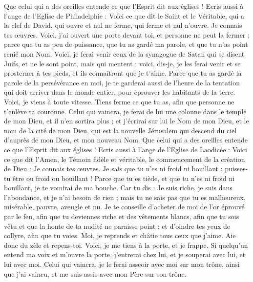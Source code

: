 \begin{multicols}{2}
Que celui qui a des oreilles entende ce que l'Esprit dit aux églises !
Ecris aussi à l'ange de l'Eglise de Philadelphie : Voici ce que dit le Saint et le Véritable, qui a la clef de David, qui ouvre et nul ne ferme, qui ferme et nul n'ouvre.
Je connais tes œuvres. Voici, j'ai ouvert une porte devant toi, et personne ne peut la fermer ; parce que tu as peu de puissance, que tu as gardé ma parole, et que tu n'as point renié mon Nom.
Voici, je ferai venir ceux de la synagogue de Satan qui se disent Juifs, et ne le sont point, mais qui mentent ; voici, dis-je, je les ferai venir et se prosterner à tes pieds, et ils connaîtront que je t'aime.
Parce que tu as gardé la parole de la persévérance en moi, je te garderai aussi de l'heure de la tentation qui doit arriver dans le monde entier, pour éprouver les habitants de la terre.
Voici, je viens à toute vitesse. Tiens ferme ce que tu as, afin que personne ne t'enlève ta couronne.
Celui qui vaincra, je ferai de lui une colonne dans le temple de mon Dieu, et il n'en sortira plus ; et j'écrirai sur lui le Nom de mon Dieu, et le nom de la cité de mon Dieu, qui est la nouvelle Jérusalem qui descend du ciel d'auprès de mon Dieu, et mon nouveau Nom.
Que celui qui a des oreilles entende ce que l'Esprit dit aux églises !
Ecris aussi à l'ange de l'Eglise de Laodicée : Voici ce que dit l'Amen, le Témoin fidèle et véritable, le commencement de la création de Dieu :
Je connais tes œuvres. Je sais que tu n'es ni froid ni bouillant ; puisses-tu être ou froid ou bouillant !
Parce que tu es tiède, et que tu n'es ni froid ni bouillant, je te vomirai de ma bouche.
Car tu dis : Je suis riche, je suis dans l'abondance, et je n'ai besoin de rien ; mais tu ne sais pas que tu es malheureux, misérable, pauvre, aveugle et nu.
Je te conseille d'acheter de moi de l'or éprouvé par le feu, afin que tu deviennes riche et des vêtements blancs, afin que tu sois vêtu et que la honte de ta nudité ne paraisse point ; et d'oindre tes yeux de collyre, afin que tu voies.
Moi, je reprends et châtie tous ceux que j'aime. Aie donc du zèle et repens-toi.
Voici, je me tiens à la porte, et je frappe. Si quelqu'un entend ma voix et m'ouvre la porte, j'entrerai chez lui, et je souperai avec lui, et lui avec moi.
Celui qui vaincra, je le ferai asseoir avec moi sur mon trône, ainsi que j'ai vaincu, et me suis assis avec mon Père sur son trône.

\end{multicols}
